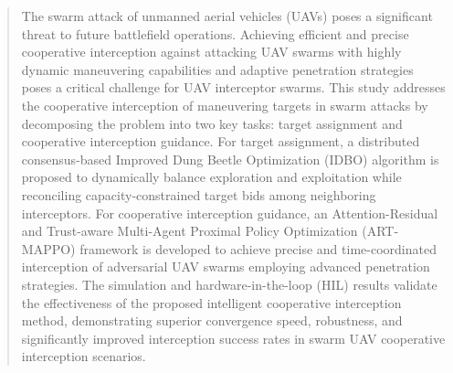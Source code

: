 \documentclass[lettersize,journal]{IEEEtran}
\begin{document}
\begin{abstract}
The swarm attack of unmanned aerial vehicles (UAVs) poses a significant threat to future
battlefield operations.
Achieving efficient and precise cooperative interception against attacking UAV swarms with
highly dynamic maneuvering capabilities and adaptive penetration strategies poses a critical
challenge for UAV interceptor swarms.
This study addresses the cooperative interception of maneuvering targets in swarm attacks by
decomposing the problem into two key tasks: target assignment and cooperative interception
guidance.
For target assignment, a distributed consensus-based Improved Dung Beetle
Optimization (IDBO) algorithm is proposed to dynamically balance exploration
and exploitation while reconciling capacity-constrained target bids among
neighboring interceptors.
For cooperative interception guidance, an Attention-Residual and Trust-aware Multi-Agent Proximal Policy Optimization (ART-MAPPO) framework is developed to achieve precise and time-coordinated interception of adversarial UAV swarms employing advanced penetration strategies.
The simulation and hardware-in-the-loop (HIL) results validate the effectiveness
of the proposed intelligent cooperative interception method, demonstrating
superior convergence speed, robustness, and significantly improved interception
success rates in swarm UAV cooperative interception scenarios.
\end{abstract}
\end{document}
